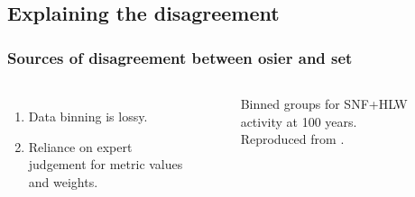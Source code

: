 \subsection{Explaining the disagreement}
\begin{frame}
  \frametitle{Sources of disagreement between \gls{osier} and \gls{set}}
    \begin{columns}
        \column[t]{3.5cm}
            \begin{enumerate}
                \item Data binning is lossy.
                \item Reliance on expert judgement for metric values and weights.
            \end{enumerate}
        \pause        
        \column[t]{6.5cm}
          \begin{figure}[htbp!]
            \begin{center}
            \resizebox{\columnwidth}{!}{}
            \end{center}
                \caption{Binned groups for SNF+HLW activity at 100 years. Reproduced from \cite{wigeland_nuclear_2014}.}
            \label{fig:set_activity_bin2}
        \end{figure}
    \end{columns}
\end{frame}